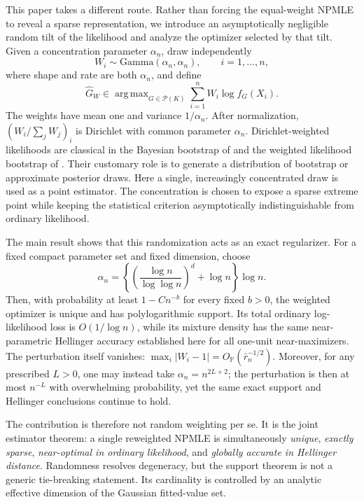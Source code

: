 \documentclass[11pt]{article}
\theoremstyle{definition}
\theoremstyle{remark}
\DeclareMathOperator*{\argmax}{arg\,max}
\newcommand{\Pcal}{\mathcal P}
\newcommand{\PP}{\mathbb P}
\newcommand{\abs}[1]{\lvert #1\rvert}
\newcommand{\Ghat}{\widehat G}
\begin{document}
This paper takes a different route.  Rather than forcing the equal-weight
NPMLE to reveal a sparse representation, we introduce an asymptotically
negligible random tilt of the likelihood and analyze the optimizer selected by
that tilt.  Given a concentration parameter $\alpha_n$, draw independently
\[
 W_i\sim\mathrm{Gamma}(\alpha_n,\alpha_n),
 \qquad i=1,\ldots,n,
\]
where shape and rate are both $\alpha_n$, and define
\begin{equation}\label{eq:rrnpmle-intro}
 \Ghat_W\in\argmax_{G\in\Pcal(K)}
       \sum_{i=1}^n W_i\log f_G(X_i).
\end{equation}
The weights have mean one and variance $1/\alpha_n$.  After normalization,
$(W_i/\sum_jW_j)_i$ is Dirichlet with common parameter $\alpha_n$.
Dirichlet-weighted likelihoods are classical in the Bayesian bootstrap of
\citet{rubin1981} and the weighted likelihood bootstrap of
\citet{newtonraftery1994}.  Their customary role is to generate a distribution
of bootstrap or approximate posterior draws.  Here a single, increasingly
concentrated draw is used as a point estimator.  The concentration is chosen
to expose a sparse extreme point while keeping the statistical criterion
asymptotically indistinguishable from ordinary likelihood.

The main result shows that this randomization acts as an exact regularizer.
For a fixed compact parameter set and fixed dimension, choose
\[
 \alpha_n=\left\{\left(\frac{\log n}{\log\log n}\right)^d
                 +\log n\right\}\log n.
\]
Then, with probability at least $1-Cn^{-b}$ for every fixed $b>0$, the
weighted optimizer is unique and has polylogarithmic support.  Its total
ordinary log-likelihood loss is $O(1/\log n)$, while its mixture density has
the same near-parametric Hellinger accuracy established here for all
one-unit near-maximizers.  The perturbation itself vanishes:
$\max_i\abs{W_i-1}=O_{\PP}(\bar r_n^{-1/2})$.  Moreover, for any prescribed
$L>0$, one may instead take $\alpha_n=n^{2L+2}$; the perturbation is then at
most $n^{-L}$ with overwhelming probability, yet the same exact support and
Hellinger conclusions continue to hold.

The contribution is therefore not random weighting per se.  It is the joint
estimator theorem: a single reweighted NPMLE is simultaneously
\emph{unique}, \emph{exactly sparse}, \emph{near-optimal in ordinary
likelihood}, and \emph{globally accurate in Hellinger distance}.  Randomness
resolves degeneracy, but the support theorem is not a generic tie-breaking
statement.  Its cardinality is controlled by an analytic effective dimension
of the Gaussian fitted-value set.
\end{document}
